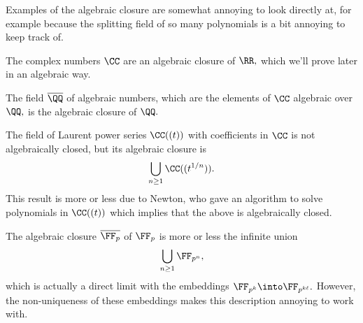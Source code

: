 \documentclass[../notes.tex]{subfiles}
\begin{document}


Examples of the algebraic closure are somewhat annoying to look directly at, for example because the splitting field of so many polynomials is a bit annoying to keep track of.
\begin{example}
	The complex numbers $\CC$ are an algebraic closure of $\RR,$ which we'll prove later in an algebraic way.
\end{example}
\begin{example}
	The field $\overline\QQ$ of algebraic numbers, which are the elements of $\CC$ algebraic over $\QQ,$ is the algebraic closure of $\QQ.$
\end{example}
\begin{example}
	The field of Laurent power series $\CC((t))$ with coefficients in $\CC$ is not algebraically closed, but its algebraic closure is
	\[\bigcup_{n\ge1}\CC((t^{1/n})).\]
	This result is more or less due to Newton, who gave an algorithm to solve polynomials in $\CC((t))$ which implies that the above is algebraically closed.
\end{example}
\begin{example}
	The algebraic closure $\overline{\FF_p}$ of $\FF_p$ is more or less the infinite union
	\[\bigcup_{n\ge1}\FF_{p^n},\]
	which is actually a direct limit with the embeddings $\FF_{p^k}\into\FF_{p^{k\ell}}.$ However, the non-uniqueness of these embeddings makes this description annoying to work with.
\end{example}
\end{document}

